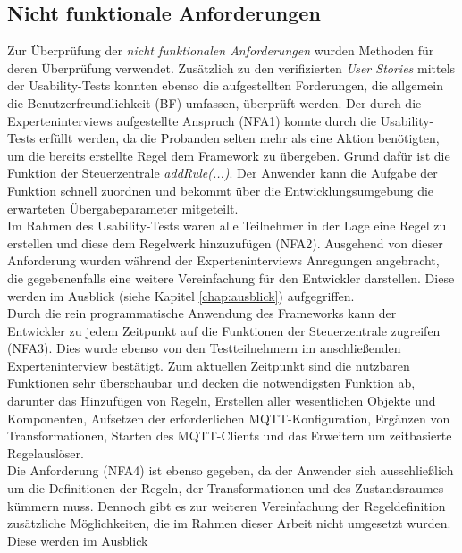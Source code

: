     \subsection*{Nicht funktionale Anforderungen}
        Zur Überprüfung der \textit{nicht funktionalen Anforderungen} wurden Methoden für deren Überprüfung verwendet. Zusätzlich zu den 
        verifizierten \textit{User Stories} mittels der Usability-Tests konnten ebenso die aufgestellten Forderungen, die allgemein 
        die Benutzerfreundlichkeit (BF) umfassen, überprüft werden. Der durch die Experteninterviews aufgestellte Anspruch (NFA1) konnte 
        durch die Usability-Tests erfüllt werden, da die Probanden selten mehr als eine Aktion benötigten, um die bereits erstellte Regel 
        dem Framework zu übergeben. Grund dafür ist die Funktion der Steuerzentrale \textit{addRule(...)}. Der Anwender kann die Aufgabe der Funktion 
        schnell zuordnen und bekommt über die Entwicklungsumgebung die erwarteten Übergabeparameter mitgeteilt. 
        \\
        \linebreak 
        Im Rahmen des Usability-Tests waren alle Teilnehmer in der Lage eine Regel zu erstellen 
        und diese dem Regelwerk hinzuzufügen (NFA2). Ausgehend von dieser Anforderung wurden 
        während der Experteninterviews Anregungen angebracht, die gegebenenfalls eine weitere Vereinfachung für den Entwickler darstellen. 
        Diese werden im Ausblick (siehe Kapitel \ref{chap:ausblick}) aufgegriffen. 
        \\
        Durch die rein programmatische Anwendung des Frameworks kann der Entwickler zu jedem Zeitpunkt auf die Funktionen der Steuerzentrale zugreifen (NFA3). 
        Dies wurde ebenso von den Testteilnehmern im anschließenden Experteninterview bestätigt. Zum aktuellen Zeitpunkt sind die nutzbaren Funktionen sehr 
        überschaubar und decken die notwendigsten Funktion ab, darunter das Hinzufügen von Regeln, 
        Erstellen aller wesentlichen Objekte und Komponenten, Aufsetzen der erforderlichen \acs{MQTT}-Konfiguration, Ergänzen von Transformationen, Starten 
        des \acs{MQTT}-Clients und das Erweitern um zeitbasierte Regelauslöser. 
        \\
        \linebreak 
        Die Anforderung (NFA4) ist ebenso gegeben, da der Anwender sich 
        ausschließlich um die Definitionen der Regeln, der Transformationen und des Zustandsraumes kümmern muss. Dennoch gibt es zur weiteren 
        Vereinfachung der Regeldefinition zusätzliche Möglichkeiten, die im Rahmen dieser Arbeit nicht umgesetzt wurden. Diese werden im Ausblick 
